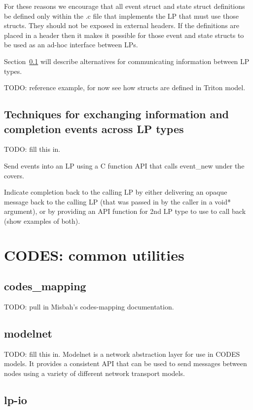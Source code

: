 \documentclass[conference,10pt,compsocconf,onecolumn]{IEEEtran}
\begin{document}
For these reasons we encourage that all event struct and state struct
definitions be defined only within the .c file that implements the LP that
must use those structs.  They should not be exposed in external
headers.  If the definitions are placed in a header then it makes it
possible for those event and state structs to be used as an ad-hoc interface
between LPs.

Section~\ref{sec:completion} will describe alternatives for communicating
information between LP types.

TODO: reference example, for now see how structs are defined in Triton
model.

\subsection{Techniques for exchanging information and completion events
across LP types}
\label{sec:completion}

TODO: fill this in.

Send events into an LP using a C function API that calls event\_new under
the covers.

Indicate completion back to the calling LP by either delivering an opaque 
message back to the calling LP (that was passed in by the caller in a void*
argument), or by providing an API function for 2nd LP type to
use to call back (show examples of both).

\section{CODES: common utilities}

\subsection{codes\_mapping}
\label{sec:mapping}

TODO: pull in Misbah's codes-mapping documentation.

\subsection{modelnet}

TODO: fill this in.  Modelnet is a network abstraction layer for use in
CODES models.  It provides a consistent API that can be used to send
messages between nodes using a variety of different network transport
models.

\subsection{lp-io}
\end{document}
